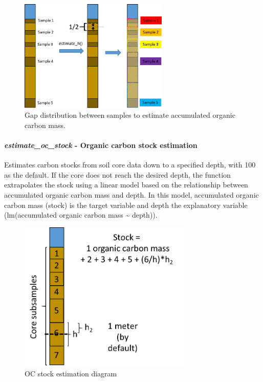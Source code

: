 \documentclass[10pt,a4paper,onecolumn]{article}
\let\oldparagraph\paragraph
\renewcommand{\paragraph}[1]{\oldparagraph{#1}\mbox{}}
\begin{document}
\begin{figure}
\centering
\includegraphics[width=2.79167in,height=\textheight,keepaspectratio]{images/estimate_h-01.png}
\caption{Gap distribution between samples to estimate accumulated
organic carbon mass.}
\end{figure}

\paragraph{\texorpdfstring{\textbf{\emph{estimate\_oc\_stock}} \textbf{-
Organic carbon stock
estimation}}{estimate\_oc\_stock - Organic carbon stock estimation}}\label{estimate_oc_stock---organic-carbon-stock-estimation}

Estimates carbon stocks from soil core data down to a specified depth,
with 100 as the default. If the core does not reach the desired depth,
the function extrapolates the stock using a linear model based on the
relationship between accumulated organic carbon mass and depth. In this
model, accumulated organic carbon mass (stock) is the target variable
and depth the explanatory variable (lm(accumulated organic carbon mass
\textasciitilde{} depth)).

\begin{figure}
\centering
\includegraphics[width=3.25in,height=\textheight,keepaspectratio]{images/estimate_stock-01.png}
\caption{OC stock estimation diagram}
\end{figure}
\end{document}
